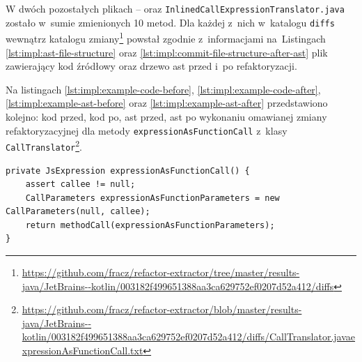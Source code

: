 \documentclass[twoside]{praca}
\begin{document}
W dwóch pozostałych plikach --  oraz \texttt{Inlined\-Call\-Expre\-ssion\-Translator.java} zostało w~sumie zmienionych 10 metod. Dla każdej z~nich w~katalogu \texttt{diffs} wewnątrz katalogu zmiany\footnote{\url{https://github.com/fracz/refactor-extractor/tree/master/results-java/JetBrains--kotlin/003182f499651388aa3ca629752ef0207d52a412/diffs}} powstał zgodnie z~informacjami na~Listingach \ref{lst:impl:ast-file-structure} oraz \ref{lst:impl:commit-file-structure-after-ast} plik zawierający kod źródłowy oraz drzewo \gls{ast} przed i~po refaktoryzacji.

Na listingach \ref{lst:impl:example-code-before}, \ref{lst:impl:example-code-after}, \ref{lst:impl:example-ast-before} oraz \ref{lst:impl:example-ast-after} przedstawiono kolejno: kod przed, kod po, \gls{ast} przed, \gls{ast} po wykonaniu omawianej zmiany refaktoryzacyjnej dla metody \texttt{expressionAsFunctionCall} z~klasy \texttt{Call\-Translator}\footnote{\url{https://github.com/fracz/refactor-extractor/blob/master/results-java/JetBrains--kotlin/003182f499651388aa3ca629752ef0207d52a412/diffs/CallTranslator.javaexpressionAsFunctionCall.txt}}.

\begin{lstlisting}[frame=single,caption={Przykładowa metoda poddana refaktoryzacji: kod przed zmianą},captionpos=b,label={lst:impl:example-code-before}]
private JsExpression expressionAsFunctionCall() {
    assert callee != null;
    CallParameters expressionAsFunctionParameters = new CallParameters(null, callee);
    return methodCall(expressionAsFunctionParameters);
}
\end{lstlisting}
\end{document}
